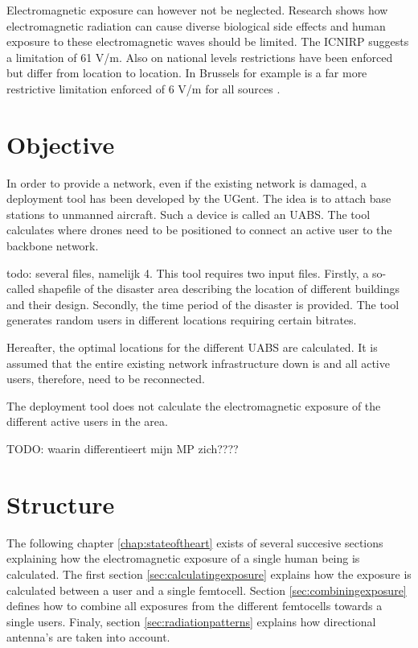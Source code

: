 Electromagnetic exposure can however not be neglected. Research shows how electromagnetic radiation can cause diverse biological side effects \cite{bioeffects} and human exposure to these electromagnetic waves should be limited. The \gls{ICNIRP} 
suggests a limitation of 61 V/m. Also on national levels restrictions have been enforced but differ from location to location. In Brussels for example is a far more restrictive limitation enforced of 6 V/m for all sources \cite{J1, J5}.
\section{Objective}
\label{sec:objective}

In order to provide a network, even if the existing network is damaged, a deployment tool has been developed by the UGent. The idea is to attach base stations to unmanned aircraft. Such a device is called an \gls{UABS}. The tool calculates where drones need to be positioned to connect an active user to the backbone network. 

todo: several files, namelijk 4.
This tool requires two input files. Firstly, a so-called shapefile of the disaster area describing the location of different buildings and their design. Secondly, the time period of the disaster is provided. The tool generates random users in different locations requiring certain bitrates.

Hereafter, the optimal locations for the different \gls{UABS} are calculated. It is assumed that the entire existing network infrastructure down is and all active users, therefore, need to be reconnected.

The deployment tool does not calculate the electromagnetic exposure of the different active users in the area.

TODO: waarin differentieert mijn MP zich????

\section{Structure}
\label{sec:structure}

The following chapter \ref{chap:stateoftheart} exists of several succesive sections explaining how the electromagnetic exposure of a single human being is calculated. The first section \ref{sec:calculatingexposure}
explains how the exposure is calculated between a user and a single femtocell. Section \ref{sec:combiningexposure}  defines how to combine all exposures from the different femtocells towards a single users.
Finaly, section \ref{sec:radiationpatterns} explains how directional antenna's are taken into account.

